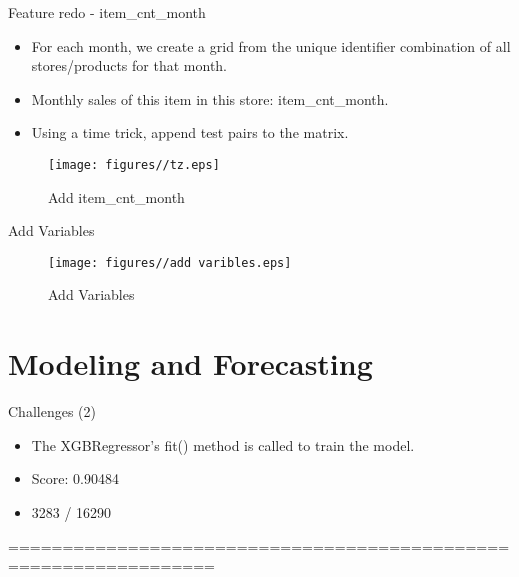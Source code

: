 \documentclass[
 size=14pt,
 paper=smartboard,  %
 mode=present, 		%
 display=slides, 	%
 style=tuliplab,  	%
 pauseslide,
 fleqn,leqno]{powerdot}
\begin{document}
\begin{slide}{Feature redo - item\_cnt\_month}
	\begin{itemize}
	\item 
	For each month, we create a grid from the unique identifier combination of all stores/products for that month.
	\item
	Monthly sales of this item in this store: item\_cnt\_month.
	\item 
	Using a time trick, append test pairs to the matrix.
	\end{itemize}
	\begin{figure}
		\centering
		\texttt{[image: figures//tz.eps]}
		\caption{Add item\_cnt\_month}\label{fig:timg}
	\end{figure}

\end{slide}


\begin{slide}{Add Variables}
	\begin{figure}
	\centering
	\texttt{[image: figures//add varibles.eps]}
	\caption{Add Variables}\label{fig:timg}
\end{figure}

\end{slide}

\section{Modeling and Forecasting}

\begin{slide}{Challenges (2)}

\begin{itemize}
\item
The XGBRegressor’s fit() method is called to train the model.
\item 
Score: 0.90484
\item 
3283 / 16290
\end{itemize}



\end{slide}



=================================================================
%
\end{document}
